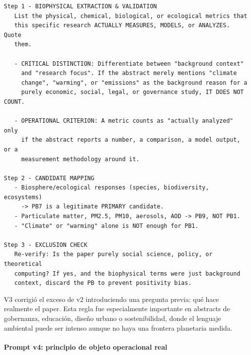 {\footnotesize
\begin{verbatim}
Step 1 - BIOPHYSICAL EXTRACTION & VALIDATION
   List the physical, chemical, biological, or ecological metrics that
   this specific research ACTUALLY MEASURES, MODELS, or ANALYZES. Quote
   them.

   - CRITICAL DISTINCTION: Differentiate between "background context"
     and "research focus". If the abstract merely mentions "climate
     change", "warming", or "emissions" as the background reason for a
     purely economic, social, legal, or governance study, IT DOES NOT COUNT.

   - OPERATIONAL CRITERION: A metric counts as "actually analyzed" only
     if the abstract reports a number, a comparison, a model output, or a
     measurement methodology around it.

Step 2 - CANDIDATE MAPPING
   - Biosphere/ecological responses (species, biodiversity, ecosystems)
     -> PB7 is a legitimate PRIMARY candidate.
   - Particulate matter, PM2.5, PM10, aerosols, AOD -> PB9, NOT PB1.
   - "Climate" or "warming" alone is NOT enough for PB1.

Step 3 - EXCLUSION CHECK
   Re-verify: Is the paper purely social science, policy, or theoretical
   computing? If yes, and the biophysical terms were just background
   context, discard the PB to prevent positivity bias.
\end{verbatim}
}

V3 corrigió el exceso de v2 introduciendo una pregunta previa: qué hace realmente el paper. Esta regla fue especialmente importante en abstracts de gobernanza, educación, diseño urbano o sostenibilidad, donde el lenguaje ambiental puede ser intenso aunque no haya una frontera planetaria medida.

\paragraph*{Prompt v4: principio de objeto operacional real}

